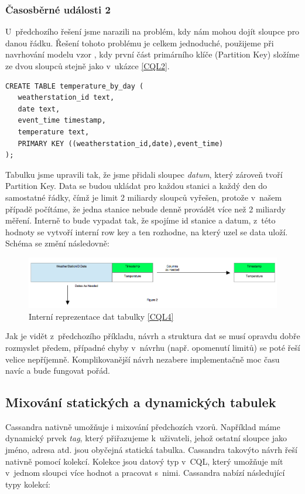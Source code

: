 \subsubsection*{Časosběrné události 2}
U~předchozího řešení jsme narazili na problém, kdy nám mohou dojít sloupce pro danou řádku. Řešení tohoto problému je celkem jednoduché, použijeme při navrhování modelu vzor , kdy první část primárního klíče (Partition Key) složíme ze dvou sloupců stejně jako v~ukázce \ref{CQL2}.


\begin{lstlisting}[caption={Dynamická tabulka 2},label=CQL4]
CREATE TABLE temperature_by_day (
   weatherstation_id text,
   date text,
   event_time timestamp,
   temperature text,
   PRIMARY KEY ((weatherstation_id,date),event_time)
);
\end{lstlisting}

Tabulku jsme upravili tak, že jsme přidali sloupec \emph{datum}, který zároveň tvoří Partition Key. Data se budou ukládat pro každou stanici a každý den do samostatné řádky, čímž je limit 2 miliardy sloupců vyřešen, protože v~našem případě počítáme, že jedna stanice nebude denně provádět více než 2 miliardy měření. Interně to bude vypadat tak, že spojíme id stanice a datum, z~této hodnoty se vytvoří interní row key a ten rozhodne, na který uzel se data uloží. Schéma se změní následovně: 

\begin{figure}[h]
\centering
\includegraphics[scale=0.4]{images/timeseries2}
\caption{Interní reprezentace dat tabulky \ref{CQL4}}
\label{fig:timeseries1}
\end{figure}

Jak je vidět z~předchozího příkladu, návrh a struktura dat se musí opravdu dobře rozmyslet předem, případné chyby v~návrhu (např. opomenutí limitů) se poté řeší velice nepříjemně. Komplikovanější návrh nezabere implementačně moc času navíc a bude fungovat pořád.


\subsection{Mixování statických a dynamických tabulek}
Cassandra nativně umožňuje i mixování předchozích vzorů. Například máme dynamický prvek \emph{tag}, který přiřazujeme k~uživateli, jehož ostatní sloupce jako jméno, adresa atd. jsou obyčejná statická tabulka. Cassandra takovýto návrh řeší nativně pomocí kolekcí. Kolekce jsou datový typ v~CQL, který umožňuje mít v~jednom sloupci více hodnot a pracovat s~nimi. Cassandra nabízí následující typy kolekcí:

